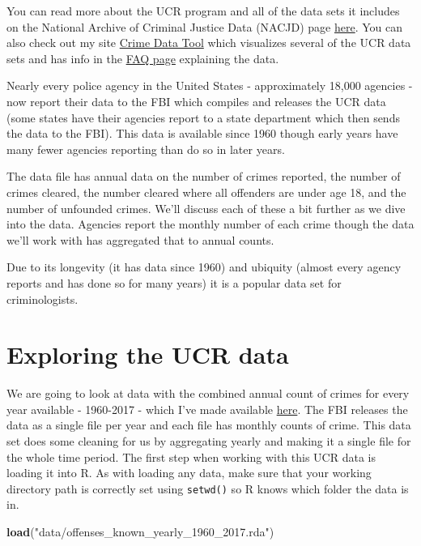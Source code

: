 \documentclass[
  12pt,
]{book}
\newenvironment{Shaded}{\begin{snugshade}}{\end{snugshade}}
\newcommand{\KeywordTok}[1]{\textcolor[rgb]{0.27,0.27,0.27}{\textbf{#1}}}
\newcommand{\NormalTok}[1]{#1}
\newcommand{\StringTok}[1]{\textcolor[rgb]{0.5,0.5,0.5}{#1}}
\begin{document}
You can read more about the UCR program and all of the data sets it includes on the National Archive of Criminal Justice Data (NACJD) page \href{https://www.icpsr.umich.edu/icpsrweb/content/NACJD/guides/ucr.html}{here}. You can also check out my site \href{http://crimedatatool.com}{Crime Data Tool} which visualizes several of the UCR data sets and has info in the \href{http://crimedatatool.com/faq.html}{FAQ page} explaining the data.

Nearly every police agency in the United States - approximately 18,000 agencies - now report their data to the FBI which compiles and releases the UCR data (some states have their agencies report to a state department which then sends the data to the FBI). This data is available since 1960 though early years have many fewer agencies reporting than do so in later years.

The data file has annual data on the number of crimes reported, the number of crimes cleared, the number cleared where all offenders are under age 18, and the number of unfounded crimes. We'll discuss each of these a bit further as we dive into the data. Agencies report the monthly number of each crime though the data we'll work with has aggregated that to annual counts.

Due to its longevity (it has data since 1960) and ubiquity (almost every agency reports and has done so for many years) it is a popular data set for criminologists.

\hypertarget{exploring-the-ucr-data}{%
\section{Exploring the UCR data}\label{exploring-the-ucr-data}}

We are going to look at data with the combined annual count of crimes for every year available - 1960-2017 - which I've made available \href{http://doi.org/10.3886/E100707V11}{here}. The FBI releases the data as a single file per year and each file has monthly counts of crime. This data set does some cleaning for us by aggregating yearly and making it a single file for the whole time period. The first step when working with this UCR data is loading it into R. As with loading any data, make sure that your working directory path is correctly set using \texttt{setwd()} so R knows which folder the data is in.

\begin{Shaded}
\begin{Highlighting}[]
\KeywordTok{load}\NormalTok{(}\StringTok{"data/offenses\_known\_yearly\_1960\_2017.rda"}\NormalTok{)}
\end{Highlighting}
\end{Shaded}
\end{document}
